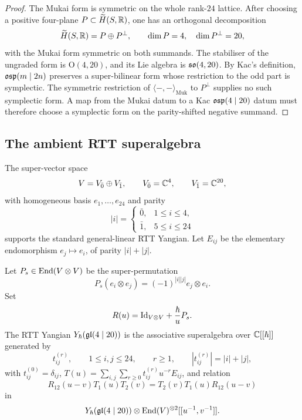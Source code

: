 \begin{proof}
The Mukai form is symmetric on the whole rank-\(24\) lattice.  After
choosing a positive four-plane \(P\subset \widetilde H(S,\mathbb{R})\), one has
an orthogonal decomposition
\[
  \widetilde H(S,\mathbb{R})=P\oplus P^\perp,
  \qquad
  \dim P=4,\quad \dim P^\perp=20,
\]
with the Mukai form symmetric on both summands.  The stabiliser of the
ungraded form is \(\mathrm{O}(4,20)\), and its Lie algebra is
\(\mathfrak{so}(4,20)\).  By Kac's definition, \(\mathfrak{osp}(m\mid 2n)\) preserves a
super-bilinear form whose restriction to the odd part is symplectic.
The symmetric restriction of \(\langle-,-\rangle_{\mathrm{Muk}}\) to
\(P^\perp\) supplies no such symplectic form.  A map from the Mukai
datum to a Kac \(\mathfrak{osp}(4\mid 20)\) datum must therefore choose a
symplectic form on the parity-shifted negative summand.
\end{proof}

\subsection*{The ambient RTT superalgebra}

The super-vector space
\[
  V=V_{\bar 0}\oplus V_{\bar 1},
  \qquad
  V_{\bar 0}=\mathbb{C}^4,\qquad V_{\bar 1}=\mathbb{C}^{20},
\]
with homogeneous basis \(e_1,\ldots,e_{24}\) and parity
\[
  |i|=
  \begin{cases}
  \bar 0, &1\leq i\leq 4,\\
  \bar 1, &5\leq i\leq 24
  \end{cases}
\]
supports the standard general-linear RTT Yangian.  Let \(E_{ij}\) be
the elementary endomorphism \(e_j\mapsto e_i\), of parity
\(|i|+|j|\).

\begin{definition}
\label{def:rtt-yangian-gl420}
Let \(P_s\in \mathrm{End}(V\otimes V)\) be the super-permutation
\[
  P_s(e_i\otimes e_j)=(-1)^{|i||j|}e_j\otimes e_i .
\]
Set
\[
  R(u)=\mathrm{Id}_{V\otimes V}+\frac{\hbar}{u}P_s .
\]
The RTT Yangian \(Y_\hbar(\mathfrak{gl}(4\mid 20))\) is the associative
superalgebra over \(\mathbb{C}[[\hbar]]\) generated by
\[
  t_{ij}^{(r)},\qquad 1\leq i,j\leq 24,\qquad r\geq 1,
  \qquad |t_{ij}^{(r)}|=|i|+|j|,
\]
with \(t_{ij}^{(0)}=\delta_{ij}\), \(T(u)=\sum_{i,j}\sum_{r\geq 0}
t_{ij}^{(r)}u^{-r}E_{ij}\), and relation
\[
  R_{12}(u-v)T_1(u)T_2(v)
  =
  T_2(v)T_1(u)R_{12}(u-v)
\]
in
\[
  Y_\hbar(\mathfrak{gl}(4\mid 20))
  \otimes \mathrm{End}(V)^{\otimes 2}[[u^{-1},v^{-1}]] .
\]
\end{definition}

